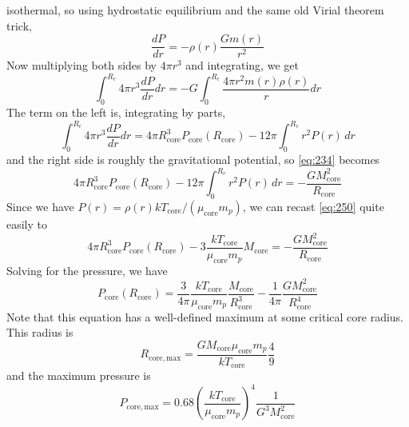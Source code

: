 \documentclass[10pt]{article}
\numberwithin{equation}{section}
\begin{document}
    isothermal, so using hydrostatic equilibrium and the same old
    Virial theorem trick,
    \begin{equation}
      \label{eq:248}
      \frac{dP}{dr}=-\rho(r)\frac{Gm(r)}{r^2}
    \end{equation}
    Now multiplying both sides by $4\pi r^3$ and integrating, we get
    \begin{equation}
      \label{eq:234}
      \int_0^{R_c}4\pi r^3\frac{dP}{dr}dr=-G\int_0^{R_c}\frac{4\pi r^2m(r)
\rho(r)}{r}dr
    \end{equation}
    The term on the left is, integrating by parts,
    \begin{equation}
      \label{eq:249}
      \int_0^{R_c}4\pi r^3\frac{dP}{dr}dr=4\pi
      R_{\mathrm{core}}^3P_{\mathrm{core}}(R_{\mathrm{core}})-12\pi\int_0^
{R_c}r^2P(r)\,dr
    \end{equation}
    and the right side is roughly the gravitational potential, so
    \eqref{eq:234} becomes
    \begin{equation}
      \label{eq:250}
      4\pi
      R_{\mathrm{core}}^3P_{\mathrm{core}}(R_{\mathrm{core}})-12\pi\int_0^
{R_c}r^2P(r)\,dr=-\frac{GM_{\mathrm{core}}^2}{R_{\mathrm{core}}}
    \end{equation}
    Since we have
    $P(r)=\rho(r)kT_{\mathrm{core}}/(\mu_{\mathrm{core}}m_p)$, we
    can recast \eqref{eq:250} quite easily to
    \begin{equation}
      \label{eq:251}
      4\pi R_{\mathrm{core}}^3P_{\mathrm{core}}(R_{\mathrm{core}})-3\frac
{kT_{\mathrm{core}}}{\mu_{\mathrm{core}}m_p}M_{\mathrm{core}}=-\frac{GM_
{\mathrm{core}}^2}{R_{\mathrm{core}}}
    \end{equation}
    Solving for the pressure, we have
    \begin{equation}
      \label{eq:252}
      P_{\mathrm{core}}(R_{\mathrm{core}})=\frac{3}{4\pi}\frac{kT_{\mathrm
{core}}}{\mu_{\mathrm{core}}m_p}\frac{M_{\mathrm{core}}}{R_{\mathrm{core}}
^3}-\frac{1}{4\pi}\frac{GM_{\mathrm{core}}^2}{R_{\mathrm{core}}^4}
    \end{equation}
    Note that this equation has a well-defined maximum at some
    critical core radius. This radius is
    \begin{equation}
      \label{eq:253}
      R_{\mathrm{core,
          max}}=\frac{GM_{\mathrm{core}}\mu_{\mathrm{core}}m_p}{k T_
{\mathrm{core}}}\frac{4}{9}
    \end{equation}
    and the maximum pressure is
    \begin{equation}
      \label{eq:254}
      P_{\mathrm{core,max}}=0.68\left(\frac{kT_{\mathrm{core}}}{\mu_{\mathrm
{core}}m_p}\right)^4\frac{1}{G^3 M_{\mathrm{core}}^2}
    \end{equation}
\end{document}

